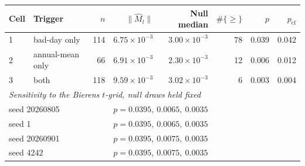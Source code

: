 \begin{tabular}{llrrrrrr}
\toprule
Cell & Trigger & $n$ & $\|\hat M_l\|$ & Null median & $\#\{\ge\}$ & $p$ & $p_{\mathrm{cf}}$ \\
\midrule
1 & bad-day only & 114 & $6.75 \times 10^{-3}$ & $3.00 \times 10^{-3}$ & 78 & 0.039 & 0.042 \\
2 & annual-mean only & 66 & $6.91 \times 10^{-3}$ & $2.30 \times 10^{-3}$ & 12 & 0.006 & 0.012 \\
3 & both & 118 & $9.59 \times 10^{-3}$ & $3.02 \times 10^{-3}$ & 6 & 0.003 & 0.004 \\
\midrule
\multicolumn{8}{l}{\textit{Sensitivity to the Bierens $t$-grid, null draws held fixed}} \\
\multicolumn{3}{l}{seed 20260805} & \multicolumn{5}{l}{$p = 0.0395,\ 0.0065,\ 0.0035$} \\
\multicolumn{3}{l}{seed 1} & \multicolumn{5}{l}{$p = 0.0395,\ 0.0065,\ 0.0035$} \\
\multicolumn{3}{l}{seed 20260901} & \multicolumn{5}{l}{$p = 0.0395,\ 0.0075,\ 0.0035$} \\
\multicolumn{3}{l}{seed 4242} & \multicolumn{5}{l}{$p = 0.0395,\ 0.0075,\ 0.0035$} \\
\bottomrule
\end{tabular}
